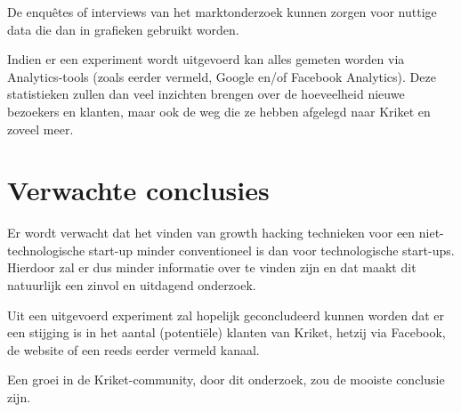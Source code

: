 De enquêtes of interviews van het marktonderzoek kunnen zorgen voor nuttige data die dan in grafieken gebruikt worden.

Indien er een experiment wordt uitgevoerd kan alles gemeten worden via Analytics-tools (zoals eerder vermeld, Google en/of Facebook Analytics). Deze statistieken zullen dan veel inzichten brengen over de hoeveelheid nieuwe bezoekers en klanten, maar ook de weg die ze hebben afgelegd naar Kriket en zoveel meer.


\section{Verwachte conclusies}
\label{sec:verwachte_conclusies}

Er wordt verwacht dat het vinden van growth hacking technieken voor een niet-technologische start-up minder conventioneel is dan voor technologische start-ups. Hierdoor zal er dus minder informatie over te vinden zijn en dat maakt dit natuurlijk een zinvol en uitdagend onderzoek.

Uit een uitgevoerd experiment zal hopelijk geconcludeerd kunnen worden dat er een stijging is in het aantal (potentiële) klanten van Kriket, hetzij via Facebook, de website of een reeds eerder vermeld kanaal.

Een groei in de Kriket-community, door dit onderzoek, zou de mooiste conclusie zijn.

